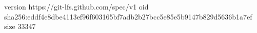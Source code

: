 version https://git-lfs.github.com/spec/v1
oid sha256:eddf4e8dbe4113ef96f603165bf7adb2b27bcc5e85e5b9147b829d5636b1a7ef
size 33347
